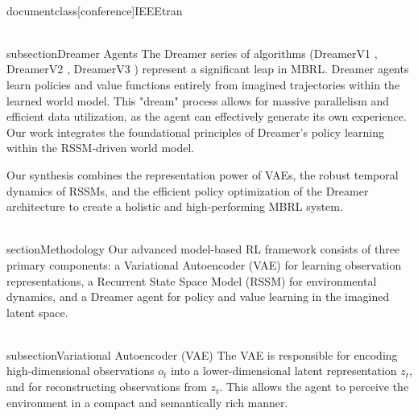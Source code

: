 \\documentclass[conference]{IEEEtran}
\begin{document}
\\subsection{Dreamer Agents}
The Dreamer series of algorithms (DreamerV1 \cite{hafner2019dreamer}, DreamerV2 \cite{hafner2020mastering}, DreamerV3 \cite{hafner2023mastering}) represent a significant leap in MBRL. Dreamer agents learn policies and value functions entirely from imagined trajectories within the learned world model. This "dream" process allows for massive parallelism and efficient data utilization, as the agent can effectively generate its own experience. Our work integrates the foundational principles of Dreamer's policy learning within the RSSM-driven world model.

Our synthesis combines the representation power of VAEs, the robust temporal dynamics of RSSMs, and the efficient policy optimization of the Dreamer architecture to create a holistic and high-performing MBRL system.

\\section{Methodology}
Our advanced model-based RL framework consists of three primary components: a Variational Autoencoder (VAE) for learning observation representations, a Recurrent State Space Model (RSSM) for environmental dynamics, and a Dreamer agent for policy and value learning in the imagined latent space.

\\subsection{Variational Autoencoder (VAE)}
The VAE is responsible for encoding high-dimensional observations \( o_t \) into a lower-dimensional latent representation \( z_t \), and for reconstructing observations from \( z_t \). This allows the agent to perceive the environment in a compact and semantically rich manner.
\end{document}
